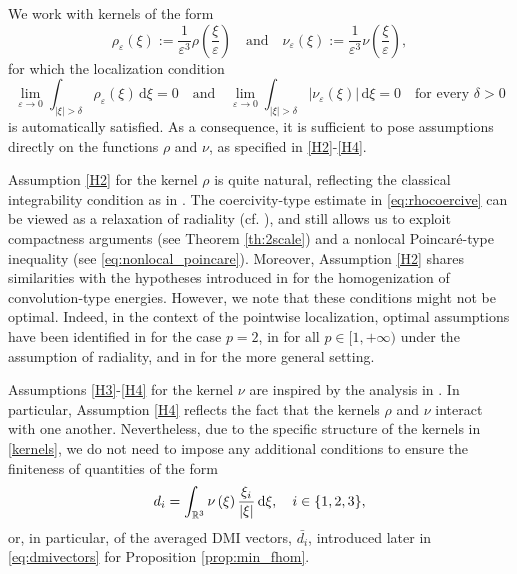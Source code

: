 \documentclass[reqno,11pt]{amsart}
\numberwithin{equation}{section}
\theoremstyle{thmlemcorr}
\numberwithin{theorem}{section}
\theoremstyle{thmlemcorr*}
\theoremstyle{defi}
\theoremstyle{remexample}
\newenvironment{remark}
  {\pushQED{\qed}\renewcommand{\qedsymbol}{$\triangle$}\remarkx}
  {\popQED\endremarkx}
\theoremstyle{ass}
\newcommand{\R}{\mathbb{R}}
\newcommand{\dd}{\,\mathrm{d}}
\DeclarePairedDelimiter{\abs}{\lvert}{\rvert}
\newcommand{\1}{\mathds{1}}
\newcommand{\veps}{\varepsilon}
\begin{document}
\begin{remark}[On Hypotheses \ref{H2}-\ref{H4}]\label{rmk:assumptions}
We work with kernels of the form
\begin{equation}\label{kernels}
\rho_\veps(\xi) := \frac{1}{\veps^3}\rho \left(\frac{\xi}{\veps} \right) \quad \text{and} \quad \nu_\veps(\xi) := \frac{1}{\veps^3}\nu \left(\frac{\xi}{\veps} \right), 
\end{equation} 
for which the localization condition
\begin{equation*}
\lim_{\veps \to 0} \int_{|\xi| > \delta} \rho_\veps(\xi) \dd \xi = 0 \quad \text{and} \quad \lim_{\veps \to 0} \int_{|\xi| > \delta} |\nu_\veps(\xi) |\dd \xi = 0 \quad \text{for every } \delta > 0
\end{equation*} 
is automatically satisfied.
As a consequence, it is sufficient to pose assumptions directly on the functions $\rho$ and $\nu$, as specified in \ref{H2}-\ref{H4}.

Assumption \ref{H2} for the kernel $\rho$ is quite natural, reflecting the classical integrability condition as in \cite{BBM01}. The coercivity-type estimate in \eqref{eq:rhocoercive} can be viewed as a relaxation of radiality (cf. \cite{BBM01}), and still allows us to exploit compactness arguments (see Theorem \ref{th:2scale}) and a nonlocal Poincaré-type inequality (see \eqref{eq:nonlocal_poincare}).
Moreover, Assumption \ref{H2} shares similarities with the hypotheses introduced in \cite[Section 2.3]{AAB23} for the homogenization of convolution-type energies. However, we note that these conditions might not be optimal. Indeed, in the context of the pointwise localization, optimal assumptions have been identified in \cite{DDP24} for the case $p=2$, in \cite{Fog25} for all $p \in [1, +\infty)$ under the assumption of radiality, and in \cite{GeS25} for the more general setting.

Assumptions \ref{H3}-\ref{H4} for the kernel $\nu$ are inspired by the analysis in \cite{DDG24}. In particular, Assumption \ref{H4} reflects the fact that the kernels $\rho$ and $\nu$ interact with one another. Nevertheless, due to the specific structure of the kernels in \eqref{kernels}, we do not need to impose any additional conditions to ensure the finiteness of quantities of the form
\begin{equation*}
d_i
    =\int_{\R^3} \nu\left(\xi\right)\frac{\xi_i}{\abs{\xi}}\dd \xi, \quad \text{$i\in \{1,2,3\}$},
\end{equation*}
or, in particular, of the averaged DMI vectors, $\bar{d_i}$, introduced later in \eqref{eq:dmivectors} for Proposition \ref{prop:min_fhom}.

\end{remark}
\end{document}
